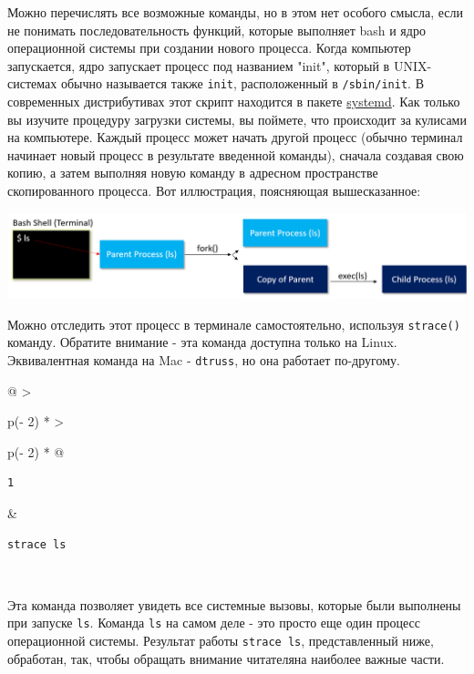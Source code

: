 \documentclass{article}
\begin{document}
Можно перечислять все возможные команды, но в этом нет особого смысла,
если не понимать последовательность функций, которые выполняет bash и
ядро операционной системы при создании нового процесса. Когда компьютер
запускается, ядро запускает процесс под названием "init", который в
UNIX-системах обычно называется также \texttt{init}, расположенный в
\texttt{/sbin/init}. В современных дистрибутивах этот скрипт находится в
пакете \href{https://en.wikipedia.org/wiki/Systemd}{systemd}. Как только
вы изучите процедуру загрузки системы, вы поймете, что происходит за
кулисами на компьютере. Каждый процесс может начать другой процесс
(обычно терминал начинает новый процесс в результате введенной команды),
сначала создавая свою копию, а затем выполняя новую команду в адресном
пространстве скопированного процесса. Вот иллюстрация, поясняющая
вышесказанное:

\includegraphics{blog/2019/bash-essentials/processes-linux.png}

Можно отследить этот процесс в терминале самостоятельно, используя
\texttt{strace()} команду. Обратите внимание - эта команда доступна
только на Linux. Эквивалентная команда на Mac - \texttt{dtruss}, но она
работает по-другому.

\begin{longtable}[]{@{}
  >{\raggedright\arraybackslash}p{(\columnwidth - 2\tabcolsep) * }
  >{\raggedright\arraybackslash}p{(\columnwidth - 2\tabcolsep) * }@{}}
\toprule
\endhead
\begin{minipage}[t]{\linewidth}\raggedright
\begin{verbatim}
1
\end{verbatim}
\end{minipage} & \begin{minipage}[t]{\linewidth}\raggedright
\begin{verbatim}
strace ls
\end{verbatim}
\end{minipage} \\ \addlinespace
\bottomrule
\end{longtable}

Эта команда позволяет увидеть все системные вызовы, которые были
выполнены при запуске \texttt{ls}. Команда \texttt{ls} на самом деле -
это просто еще один процесс операционной системы. Результат работы
\texttt{strace\ ls}, представленный ниже, обработан, так, чтобы обращать
внимание читателяна наиболее важные части.
\end{document}
